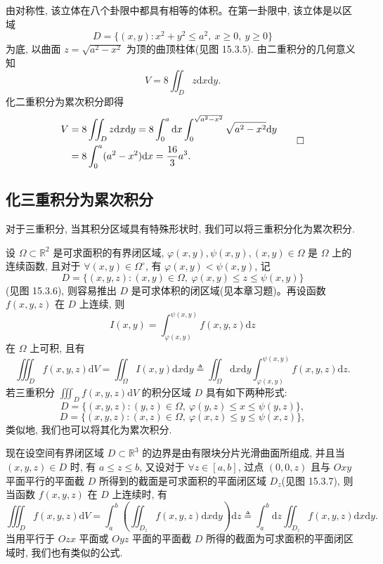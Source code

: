 \begin{solve}
由对称性, 该立体在八个卦限中都具有相等的体积。在第一卦限中, 该立体是以区域
\[
  D=\{(x,y):x^2+y^2\leqslant a^2,\ x\geqslant0,\ y\geqslant0\}
\]
为底, 以曲面 $z=\sqrt{a^2-x^2}$ 为顶的曲顶柱体(见图 15.3.5).
由二重积分的几何意义知
\[
  V=8\iint_D z\mathrm dx\mathrm dy.
\]
化二重积分为累次积分即得
\[
\begin{aligned}
  V
  &=8\iint_D z\mathrm dx\mathrm dy
    =8\int_0^a\mathrm dx\int_0^{\sqrt{a^2-x^2}}\sqrt{a^2-x^2}\mathrm dy\\
  &=8\int_0^a(a^2-x^2)\mathrm dx
    =\frac{16}{3}a^3.
\end{aligned}
\qedhere
\]
\end{solve}


\subsection{化三重积分为累次积分}
\label{subsec:ma-15-3-2}

对于三重积分, 当其积分区域具有特殊形状时, 我们可以将三重积分化为累次积分.

设 $\Omega\subset\mathbb R^2$ 是可求面积的有界闭区域, $\varphi(x,y),\psi(x,y),(x,y)\in\Omega$ 是 $\Omega$ 上的连续函数, 且对于 $\forall(x,y)\in\Omega^\circ$, 有 $\varphi(x,y)<\psi(x,y)$, 记
\[
  D=\{(x,y,z):(x,y)\in\Omega,\ \varphi(x,y)\leqslant z\leqslant\psi(x,y)\}
\]
(见图 15.3.6), 则容易推出 $D$ 是可求体积的闭区域(见本章习题)。再设函数 $f(x,y,z)$ 在 $D$ 上连续, 则
\[
  I(x,y)=\int_{\varphi(x,y)}^{\psi(x,y)}f(x,y,z)\mathrm dz
\]
在 $\Omega$ 上可积, 且有
\[
  \iiint_D f(x,y,z)\mathrm dV
  =\iint_\Omega I(x,y)\mathrm dx\mathrm dy
  \triangleq \iint_\Omega\mathrm dx\mathrm dy
    \int_{\varphi(x,y)}^{\psi(x,y)}f(x,y,z)\mathrm dz.
\]
若三重积分 $\iiint_D f(x,y,z)\mathrm dV$ 的积分区域 $D$ 具有如下两种形式:
\[
  D=\{(x,y,z):(y,z)\in\Omega,\ \varphi(y,z)\leqslant x\leqslant\psi(y,z)\},
\]
\[
  D=\{(x,y,z):(x,z)\in\Omega,\ \varphi(x,z)\leqslant y\leqslant\psi(x,z)\},
\]
类似地, 我们也可以将其化为累次积分.

现在设空间有界闭区域 $D\subset\mathbb R^3$ 的边界是由有限块分片光滑曲面所组成, 并且当 $(x,y,z)\in D$ 时, 有 $a\leqslant z\leqslant b$, 又设对于 $\forall z\in[a,b]$, 过点 $(0,0,z)$ 且与 $Oxy$ 平面平行的平面截 $D$ 所得到的截面是可求面积的平面闭区域 $D_z$(见图 15.3.7), 则当函数 $f(x,y,z)$ 在 $D$ 上连续时, 有
\[
  \iiint_D f(x,y,z)\mathrm dV
  =\int_a^b\left(\iint_{D_z}f(x,y,z)\mathrm dx\mathrm dy\right)\mathrm dz
  \triangleq \int_a^b\mathrm dz\iint_{D_z}f(x,y,z)\mathrm dx\mathrm dy.
\]
当用平行于 $Ozx$ 平面或 $Oyz$ 平面的平面截 $D$ 所得的截面为可求面积的平面闭区域时, 我们也有类似的公式.

